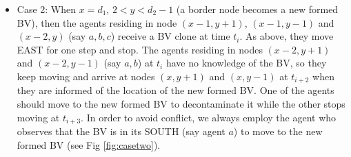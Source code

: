 \begin{itemize}
\item Case 2: When $x=d_1$, $2<y<d_2-1$ (a border node becomes a new formed BV), then the agents residing in node $(x-1, y+1)$, $(x-1, y-1)$ and $(x-2, y)$  (say  $a,b,c$)  receive a BV clone at time $t_i$. As above, they move EAST for one step and stop. The agents residing in nodes $(x-2, y+1)$ and $(x-2, y-1)$ (say  $a,b$) at $t_i$ have no knowledge of the BV, so they keep moving and arrive at nodes $(x, y+1)$ and $(x, y-1)$ at $t_{i+2}$ when they are informed of the location of the new formed BV. 
One of the agents  should move to the new formed BV to decontaminate it while the other stops moving at $t_{i+3}$. In order to avoid conflict, we always employ the agent  who observes that the BV is in its SOUTH (say agent $a$) to move to the new formed BV  (see Fig \ref{fig:casetwo}).
\begin{figure} [H]
  \centering 
    \hspace{1in} 

\end{figure}
\end{itemize}
